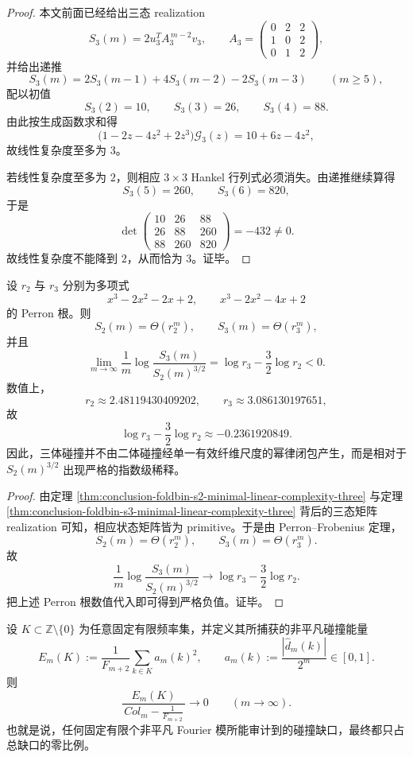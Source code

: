 \begin{proof}
本文前面已经给出三态 realization
\[
S_3(m)=2u_3^{T}A_3^{\,m-2}v_3,
\qquad
A_3=
\begin{pmatrix}
0&2&2\\
1&0&2\\
0&1&2
\end{pmatrix},
\]
并给出递推
\[
S_3(m)=2S_3(m-1)+4S_3(m-2)-2S_3(m-3)
\qquad (m\ge 5),
\]
配以初值
\[
S_3(2)=10,\qquad S_3(3)=26,\qquad S_3(4)=88.
\]
由此按生成函数求和得
\[
\bigl(1-2z-4z^2+2z^3\bigr)\mathcal G_3(z)=10+6z-4z^2,
\]
故线性复杂度至多为 \(3\)。

若线性复杂度至多为 \(2\)，则相应 \(3\times 3\) Hankel 行列式必须消失。由递推继续算得
\[
S_3(5)=260,\qquad S_3(6)=820,
\]
于是
\[
\det
\begin{pmatrix}
10&26&88\\
26&88&260\\
88&260&820
\end{pmatrix}
=-432\neq 0.
\]
故线性复杂度不能降到 \(2\)，从而恰为 \(3\)。证毕。
\end{proof}

\begin{corollary}[三体碰撞相对于二体碰撞的指数级次单形稀释]\label{cor:conclusion-foldbin-s3-vs-s2-threehalves-exponential-dilution}
设 \(r_2\) 与 \(r_3\) 分别为多项式
\[
x^3-2x^2-2x+2,
\qquad
x^3-2x^2-4x+2
\]
的 Perron 根。则
\[
S_2(m)=\Theta(r_2^m),
\qquad
S_3(m)=\Theta(r_3^m),
\]
并且
\[
\lim_{m\to\infty}\frac1m\log\frac{S_3(m)}{S_2(m)^{3/2}}
=
\log r_3-\frac32\log r_2
<0.
\]
数值上，
\[
r_2\approx 2.48119430409202,
\qquad
r_3\approx 3.086130197651,
\]
故
\[
\log r_3-\frac32\log r_2\approx -0.2361920849.
\]
因此，三体碰撞并不由二体碰撞经单一有效纤维尺度的幂律闭包产生，而是相对于 \(S_2(m)^{3/2}\) 出现严格的指数级稀释。
\end{corollary}

\begin{proof}
由定理 \ref{thm:conclusion-foldbin-s2-minimal-linear-complexity-three} 与定理 \ref{thm:conclusion-foldbin-s3-minimal-linear-complexity-three} 背后的三态矩阵 realization 可知，相应状态矩阵皆为 primitive。于是由 Perron--Frobenius 定理，
\[
S_2(m)=\Theta(r_2^m),
\qquad
S_3(m)=\Theta(r_3^m).
\]
故
\[
\frac1m\log\frac{S_3(m)}{S_2(m)^{3/2}}
\longrightarrow
\log r_3-\frac32\log r_2.
\]
把上述 Perron 根数值代入即可得到严格负值。证毕。
\end{proof}

\begin{theorem}\label{thm:conclusion-foldbin-fixed-finite-fourier-audit-vanishing-share}
设 \(K\subset \mathbb Z\setminus\{0\}\) 为任意固定有限频率集，并定义其所捕获的非平凡碰撞能量
\[
E_m(K):=\frac1{F_{m+2}}\sum_{k\in K}a_m(k)^2,
\qquad
a_m(k):=\frac{|\widehat d_m(k)|}{2^m}\in[0,1].
\]
则
\[
\frac{E_m(K)}{\,Col_m-\frac1{F_{m+2}}\,}\longrightarrow 0
\qquad (m\to\infty).
\]
也就是说，任何固定有限个非平凡 Fourier 模所能审计到的碰撞缺口，最终都只占总缺口的零比例。
\end{theorem}

